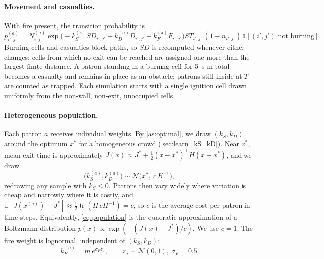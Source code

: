 \documentclass[14pt]{article}
\theoremstyle{definition}
\begin{document}
\paragraph{Movement and casualties.} With fire present, the transition probability is
\begin{equation}\label{eq:trans_prob_fire}
  p^{(a)}_{i',j'} = N^{(a)}_{i,j}
  \exp\!\bigl(-k^{(a)}_S SD_{i',j'} + k^{(a)}_D D_{i',j'} - k^{(a)}_F F_{i',j'}\bigr)
  ST_{i',j'}\,(1 - n_{i',j'})\,\mathbf{1}[(i',j') \text{ not burning}].
\end{equation}
Burning cells and casualties block paths, so $SD$ is recomputed whenever either
changes; cells from which no exit can be reached are assigned one more than the largest
finite distance. A patron standing in a burning cell for \SI{5}{s} in total becomes a
casualty and remains in place as an obstacle; patrons still inside at $T$ are counted
as trapped. Each simulation starts with a single ignition cell drawn uniformly from
the non-wall, non-exit, unoccupied cells.

\paragraph{Heterogeneous population.} Each patron $a$ receives individual weights. By
\cref{as:optimal}, we draw $(k_S, k_D)$ around the optimum $x^*$ for a homogeneous crowd
(\cref{sec:learn_kS_kD}). Near $x^*$, mean exit time is approximately
$J(x) \approx J^* + \frac{1}{2}(x - x^*)^\top H (x - x^*)$, and we draw
\begin{equation}\label{eq:population}
  \bigl(k^{(a)}_S, k^{(a)}_D\bigr) \sim \mathcal{N}\bigl(x^*,\ c\,H^{-1}\bigr),
\end{equation}
redrawing any sample with $k_S \le 0$. Patrons then vary widely where variation is
cheap and narrowly where it is costly, and
$\mathbb{E}[J(x^{(a)}) - J^*] \approx \frac{1}{2}\operatorname{tr}(H\,cH^{-1}) = c$, so
$c$ is the average cost per patron in time steps. Equivalently, \cref{eq:population} is
the quadratic approximation of a Boltzmann distribution
$p(x) \propto \exp(-(J(x) - J^*)/c)$. We use $c = 1$. The fire weight is lognormal,
independent of $(k_S, k_D)$:
\begin{equation}\label{eq:kF}
  k^{(a)}_F = m\, e^{\sigma_F z_a}, \qquad z_a \sim \mathcal{N}(0,1),\ \sigma_F = 0.5.
\end{equation}
\end{document}
